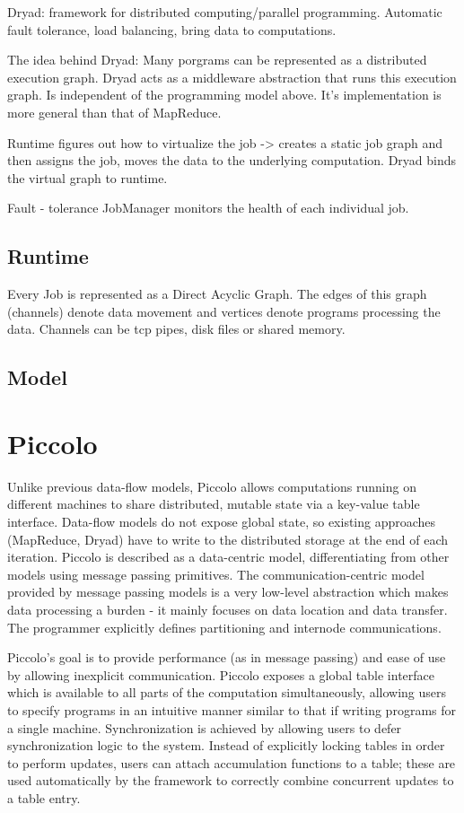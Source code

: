 \documentclass[letterpaper,twocolumn,10pt]{article}
\begin{document}
Dryad:
framework for distributed computing/parallel programming.
Automatic fault tolerance, load balancing, bring data to computations.

The idea behind Dryad:
Many porgrams can be represented as a distributed execution graph.
Dryad acts as a middleware abstraction that runs this execution graph.
Is independent of the programming model above. It's implementation is more general than that of MapReduce.

Runtime figures out how to virtualize the job -> creates a static job graph
and then assigns the job, moves the data to the underlying computation.
Dryad binds the virtual graph to runtime.

Fault - tolerance
JobManager monitors the health of each individual job.
\subsection{Runtime}
Every Job is represented as a Direct Acyclic Graph. The edges of this graph (channels) denote data movement and vertices denote programs processing the data. Channels can be tcp pipes, disk files or shared memory.
\subsection{Model}


\section{Piccolo}
Unlike previous data-flow models, Piccolo allows computations running on different machines to share distributed, mutable state via a key-value table interface. 
Data-flow models do not expose global state, so existing approaches (MapReduce, Dryad) have to write to the distributed storage at the end of each iteration.
Piccolo is described as a data-centric model, differentiating from other models using message passing primitives. 
The communication-centric model provided by message passing models is a very low-level abstraction which makes data processing a burden - it mainly focuses on data location and data transfer. The programmer explicitly defines partitioning and internode communications.

Piccolo's goal is to provide performance (as in message passing) and ease of use by allowing inexplicit communication.
Piccolo exposes a global table interface which is available to all parts of the computation simultaneously, allowing users to specify programs in an intuitive manner similar to that if writing programs for a single machine. 
Synchronization is achieved by allowing users to defer synchronization logic to the system. 
Instead of explicitly locking tables in order to perform updates, users can attach accumulation functions to a table; 
these are used automatically by the framework to correctly combine concurrent updates to a table entry.
\end{document}
